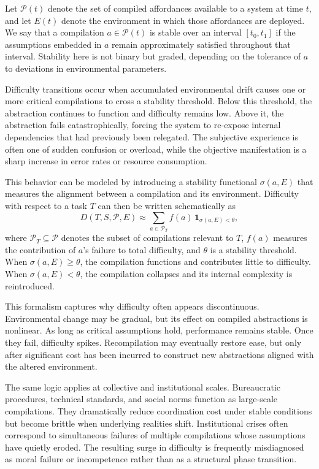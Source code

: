 \documentclass[12pt]{article}
\begin{document}
Let $\mathcal{P}(t)$ denote the set of compiled affordances available to a system at time $t$, and let $E(t)$ denote the environment in which those affordances are deployed. We say that a compilation $a \in \mathcal{P}(t)$ is stable over an interval $[t_0, t_1]$ if the assumptions embedded in $a$ remain approximately satisfied throughout that interval. Stability here is not binary but graded, depending on the tolerance of $a$ to deviations in environmental parameters.

Difficulty transitions occur when accumulated environmental drift causes one or more critical compilations to cross a stability threshold. Below this threshold, the abstraction continues to function and difficulty remains low. Above it, the abstraction fails catastrophically, forcing the system to re-expose internal dependencies that had previously been relegated. The subjective experience is often one of sudden confusion or overload, while the objective manifestation is a sharp increase in error rates or resource consumption.

This behavior can be modeled by introducing a stability functional $\sigma(a, E)$ that measures the alignment between a compilation and its environment. Difficulty with respect to a task $T$ can then be written schematically as
\[
D(T, S, \mathcal{P}, E) \approx \sum_{a \in \mathcal{P}_T} f(a)\,\mathbf{1}_{\sigma(a,E) < \theta},
\]
where $\mathcal{P}_T \subseteq \mathcal{P}$ denotes the subset of compilations relevant to $T$, $f(a)$ measures the contribution of $a$’s failure to total difficulty, and $\theta$ is a stability threshold. When $\sigma(a,E) \geq \theta$, the compilation functions and contributes little to difficulty. When $\sigma(a,E) < \theta$, the compilation collapses and its internal complexity is reintroduced.

This formalism captures why difficulty often appears discontinuous. Environmental change may be gradual, but its effect on compiled abstractions is nonlinear. As long as critical assumptions hold, performance remains stable. Once they fail, difficulty spikes. Recompilation may eventually restore ease, but only after significant cost has been incurred to construct new abstractions aligned with the altered environment.

The same logic applies at collective and institutional scales. Bureaucratic procedures, technical standards, and social norms function as large-scale compilations. They dramatically reduce coordination cost under stable conditions but become brittle when underlying realities shift. Institutional crises often correspond to simultaneous failures of multiple compilations whose assumptions have quietly eroded. The resulting surge in difficulty is frequently misdiagnosed as moral failure or incompetence rather than as a structural phase transition.
\end{document}
